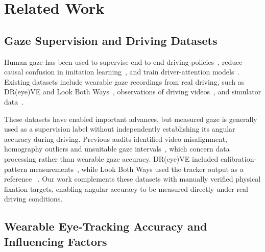 \section{Related Work}
\label{sec:related}


\subsection{Gaze Supervision and Driving Datasets}

Human gaze has been used to supervise end-to-end driving
policies~\cite{liu2019gazeModel},
reduce causal confusion in imitation
learning~\cite{biswas2024gazeSupervision}, and train driver-attention
models~\cite{palazzi2019dreyeve,xia2018bdda,gopinath2021maad}.
Existing datasets include wearable gaze recordings from real
driving, such as DR(eye)VE and Look Both
Ways~\cite{palazzi2019dreyeve,kasahara2022lookBothWays},
observations of driving videos~\cite{xia2018bdda,gopinath2021maad,fang2022dada},
and simulator data~\cite{contreras2026laia}.

These datasets have enabled important advances, but measured gaze
is generally used as a supervision label without independently
establishing its angular accuracy during driving. Previous audits
identified video misalignment, homography outliers and unsuitable
gaze intervals~\cite{kotseruba2024dataLimitations,kotseruba2024taskContext},
which concern data processing rather than wearable gaze accuracy. DR(eye)VE included
calibration-pattern measurements~\cite{palazzi2019dreyeve},
while Look Both Ways used the tracker output as a reference
~\cite{kasahara2022lookBothWays}. Our work complements these
datasets with manually verified physical fixation targets,
enabling angular accuracy to be measured directly under
real driving conditions.


\subsection{Wearable Eye-Tracking Accuracy and Influencing Factors}

